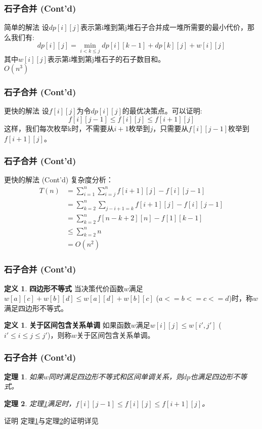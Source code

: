 \documentclass[hyperref={unicode=true}]{beamer}
\newtheorem{mytht}{\bf 定理}
\theoremstyle{definition}
\newtheorem{mydef}[]{\bf 定义}
\theoremstyle{proof}
\begin{document}
\begin{frame}\frametitle{石子合并 (Cont'd)}
  \begin{alertblock}{简单的解法}
    设$dp[i][j]$表示第i堆到第j堆石子合并成一堆所需要的最小代价，那么我们有:
    \[dp[i][j] = \min_{i < k \leq j}dp[i][k-1] + dp[k][j] + w[i][j]\]
    其中$w[i][j]$表示第i堆到第j堆石子的石子数目和。\\
    $O(n^3)$
  \end{alertblock}
\end{frame}
\begin{frame}\frametitle{石子合并 (Cont'd)}
  \begin{exampleblock}{更快的解法}
    设$f[i][j]$为令$dp[i][j]$的最优决策点。可以证明:
    \[f[i][j-1] \leq f[i][j] \leq f[i+1][j]\]
    这样，我们每次枚举k时，不需要从$i+1$枚举到$j$，只需要从$f[i][j-1]$枚举到$f[i+1][j]$。\\
  \end{exampleblock}
\end{frame}
\begin{frame}\frametitle{石子合并 (Cont'd)}
  \begin{exampleblock}{更快的解法 (Cont'd)}
    复杂度分析：
    \begin{align}
      T(n) &= \sum_{i=1}^{n}\sum_{i=j}^n f[i+1][j]-f[i][j-1]\\
      &= \sum_{k=2}^n\sum_{j-i+1=k} f[i+1][j] - f[i][j-1]\\
      &= \sum_{k=2}^n f[n-k+2][n]-f[1][k-1]\\
      &\leq \sum_{k=2}^n n\\
      &= O(n^2)
    \end{align}
  \end{exampleblock}
\end{frame}

\begin{frame}\frametitle{石子合并 (Cont'd)}
  \begin{mydef}{\bf 四边形不等式}
    当决策代价函数$w$满足$w[a][c]+w[b][d]\leq w[a][d]+w[b][c]$ ($a<=b<=c<=d$)时，称$w$满足四边形不等式。
  \end{mydef}
  \begin{mydef}{\bf 关于区间包含关系单调}
    如果函数$w$满足$w[i][j]\leq w[i',j']$ ($i' \leq i \leq j \leq j'$)，则称$w$关于区间包含关系单调。
  \end{mydef}
\end{frame}

\begin{frame}\frametitle{石子合并 (Cont'd)}
  \begin{mytht}{}\label{tht1}
    如果$w$同时满足四边形不等式和区间单调关系，则$dp$也满足四边形不等式。
  \end{mytht}
  \begin{mytht}{}\label{tht2}
    定理\ref{tht1}满足时，$f[i][j-1] \leq f[i][j] \leq f[i+1][j]$。
  \end{mytht}
  \begin{exampleblock}{证明}
    定理\ref{tht1}与定理\ref{tht2}的证明详见\cite{art3}
  \end{exampleblock}
\end{frame}
\end{document}
